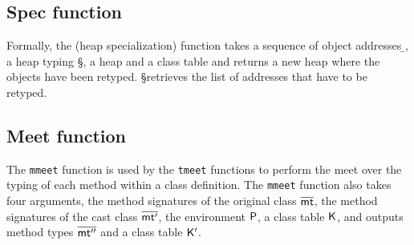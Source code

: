 \documentclass[a4paper,USenglish]{tex/lipics-v2016}
\begin{document}
\subsection{Spec function}\label{mono:spec}

Formally, the  (heap specialization) function takes a
sequence of object addresses \b\a, a heap typing \S, a heap \s
and a class table \K and returns a new heap where the objects
have been retyped. \Dom\S retrieves the list of addresses 
that have to be retyped.

\begin{mathpar}

\end{mathpar}

\subsection{Meet function}\label{monmeet}

The \texttt{mmeet} function is used by the \texttt{tmeet} functions to
perform the meet over the typing of each method within a class definition.
The \texttt{mmeet} function also takes four arguments, the method
signatures of the original class $\b\mt$, the method signatures of the cast
class $\b\mtp$, the environment $\P$, a class table $\K$, and outputs method
types $\b\mtpp$ and a class table $\Kp$. \\

\end{document}
